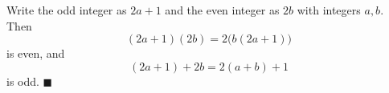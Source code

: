 Write the odd integer as $2a+1$ and the even integer as $2b$ with integers $a,b$. Then
\[(2a+1)(2b)=2\bigl(b(2a+1)\bigr)\]
is even, and
\[(2a+1)+2b=2(a+b)+1\]
is odd. $\blacksquare$
